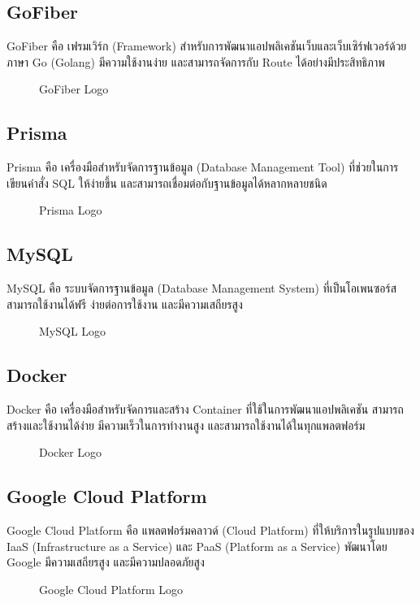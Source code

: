 \subsection{GoFiber}

GoFiber คือ เฟรมเวิร์ก (Framework) สำหรับการพัฒนาแอปพลิเคชันเว็บและเว็บเซิร์ฟเวอร์ด้วยภาษา Go (Golang) มีความใช้งานง่าย และสามารถจัดการกับ Route ได้อย่างมีประสิทธิภาพ \cite{FiberAndGormRunGolangApp}

\begin{figure}[H]
    \centering
    \caption{GoFiber Logo}
    \label{fig:gofiber}
\end{figure}

\subsection{Prisma}

Prisma คือ เครื่องมือสำหรับจัดการฐานข้อมูล (Database Management Tool) ที่ช่วยในการเขียนคำสั่ง SQL ให้ง่ายขึ้น และสามารถเชื่อมต่อกับฐานข้อมูลได้หลากหลายชนิด \cite{WhatIsPrisma}

\begin{figure}[H]
    \centering
    \caption{Prisma Logo}
    \label{fig:prisma}
\end{figure}

\newpage

\subsection{MySQL}

MySQL คือ ระบบจัดการฐานข้อมูล (Database Management System) ที่เป็นโอเพนซอร์ส สามารถใช้งานได้ฟรี ง่ายต่อการใช้งาน และมีความเสถียรสูง \cite{WhatIsMySQL}

\begin{figure}[H]
    \centering
    \caption{MySQL Logo}
    \label{fig:mysql}
\end{figure}

\subsection{Docker}

Docker คือ เครื่องมือสำหรับจัดการและสร้าง Container ที่ใช้ในการพัฒนาแอปพลิเคชัน สามารถสร้างและใช้งานได้ง่าย มีความเร็วในการทำงานสูง และสามารถใช้งานได้ในทุกแพลตฟอร์ม \cite{WhatIsDocker}

\begin{figure}[H]
    \centering
    \caption{Docker Logo}
    \label{fig:docker}
\end{figure}

\subsection{Google Cloud Platform}

Google Cloud Platform คือ แพลตฟอร์มคลาวด์ (Cloud Platform) ที่ให้บริการในรูปแบบของ IaaS (Infrastructure as a Service) และ PaaS (Platform as a Service) พัฒนาโดย Google มีความเสถียรสูง และมีความปลอดภัยสูง \cite{GCPNewbie}

\begin{figure}[H]
    \centering
    \caption{Google Cloud Platform Logo}
    \label{fig:gcp}
\end{figure}